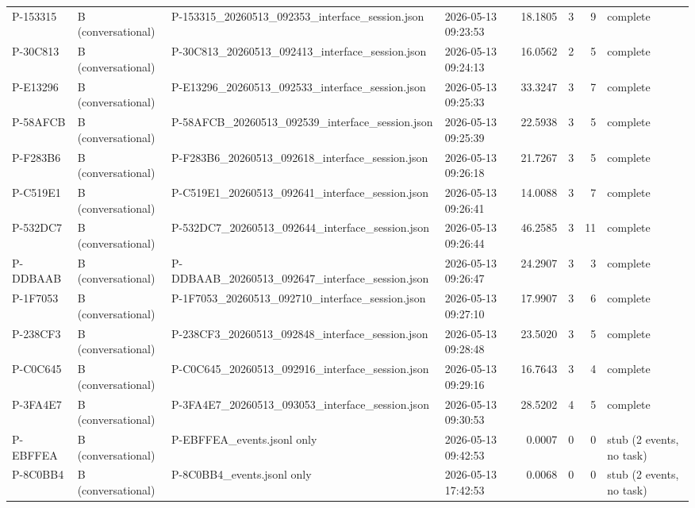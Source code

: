 \begin{tabular}{llllrrrl}
   P-153315 & B (conversational) & P-153315\_20260513\_092353\_interface\_session.json & 2026-05-13 09:23:53 &      18.1805 &                3 &           9 &                 complete \\
   P-30C813 & B (conversational) & P-30C813\_20260513\_092413\_interface\_session.json & 2026-05-13 09:24:13 &      16.0562 &                2 &           5 &                 complete \\
   P-E13296 & B (conversational) & P-E13296\_20260513\_092533\_interface\_session.json & 2026-05-13 09:25:33 &      33.3247 &                3 &           7 &                 complete \\
   P-58AFCB & B (conversational) & P-58AFCB\_20260513\_092539\_interface\_session.json & 2026-05-13 09:25:39 &      22.5938 &                3 &           5 &                 complete \\
   P-F283B6 & B (conversational) & P-F283B6\_20260513\_092618\_interface\_session.json & 2026-05-13 09:26:18 &      21.7267 &                3 &           5 &                 complete \\
   P-C519E1 & B (conversational) & P-C519E1\_20260513\_092641\_interface\_session.json & 2026-05-13 09:26:41 &      14.0088 &                3 &           7 &                 complete \\
   P-532DC7 & B (conversational) & P-532DC7\_20260513\_092644\_interface\_session.json & 2026-05-13 09:26:44 &      46.2585 &                3 &          11 &                 complete \\
   P-DDBAAB & B (conversational) & P-DDBAAB\_20260513\_092647\_interface\_session.json & 2026-05-13 09:26:47 &      24.2907 &                3 &           3 &                 complete \\
   P-1F7053 & B (conversational) & P-1F7053\_20260513\_092710\_interface\_session.json & 2026-05-13 09:27:10 &      17.9907 &                3 &           6 &                 complete \\
   P-238CF3 & B (conversational) & P-238CF3\_20260513\_092848\_interface\_session.json & 2026-05-13 09:28:48 &      23.5020 &                3 &           5 &                 complete \\
   P-C0C645 & B (conversational) & P-C0C645\_20260513\_092916\_interface\_session.json & 2026-05-13 09:29:16 &      16.7643 &                3 &           4 &                 complete \\
   P-3FA4E7 & B (conversational) & P-3FA4E7\_20260513\_093053\_interface\_session.json & 2026-05-13 09:30:53 &      28.5202 &                4 &           5 &                 complete \\
   P-EBFFEA & B (conversational) &                      P-EBFFEA\_events.jsonl only & 2026-05-13 09:42:53 &       0.0007 &                0 &           0 & stub (2 events, no task) \\
   P-8C0BB4 & B (conversational) &                      P-8C0BB4\_events.jsonl only & 2026-05-13 17:42:53 &       0.0068 &                0 &           0 & stub (2 events, no task) \\
\bottomrule
\end{tabular}
